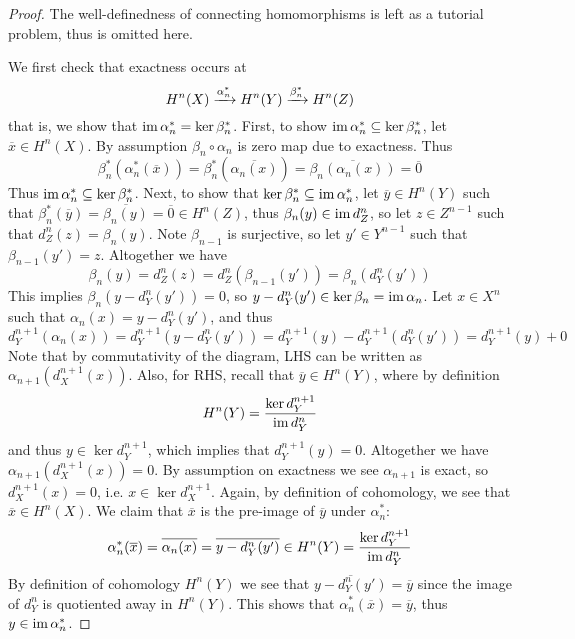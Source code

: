 \begin{proof}
    The well-definedness of connecting homomorphisms is left as a tutorial problem, thus is omitted here.

    We first check that exactness occurs at
    \[H^n(X)\xrightarrow{\alpha_n^*} H^n(Y)\xrightarrow{\beta_n^*} H^{n}(Z)\]
    that is, we show that $\operatorname{im} \alpha_n^* = \ker \beta_n^*$. First, to show $\operatorname{im} \alpha_n^* \subseteq \ker \beta_n^*$, let $\overline x\in H^n(X)$. By assumption $\beta_n\circ \alpha_n$ is zero map due to exactness. Thus 
    \[\beta_n^*(\alpha_n^*(\overline{x})) = \beta_n^*(\overline{\alpha_n(x)}) = \overline{\beta_n(\alpha_n(x))} = \overline{0}\]
    Thus $\operatorname{im} \alpha_n^*\subseteq \ker \beta_n^*$. Next, to show that $\ker \beta_n^* \subseteq \operatorname{im} \alpha_n^*$, let $\overline y\in H^n(Y)$ such that $\beta_n^*(\overline y) = \overline{\beta_n(y)}= \overline{0}\in H^n(Z)$, thus $\beta_n(y)\in \operatorname{im} d_Z^n$, so let $z\in Z^{n-1}$ such that $d_Z^n(z)=\beta_n(y)$. Note $\beta_{n-1}$ is surjective, so let $y'\in Y^{n-1}$ such that $\beta_{n-1}(y')=z$. Altogether we have
    \[\beta_n(y)=d_Z^n(z)=d_Z^n(\beta_{n-1}(y')) = \beta_n(d_Y^n(y'))\]
    This implies $\beta_n(y-d_Y^n(y'))=0$, so $y-d_Y^n(y')\in \ker \beta_n = \operatorname{im} \alpha_n$. Let $x\in X^n$ such that $\alpha_n(x) = y-d_Y^n(y')$, and thus
    \[d_Y^{n+1}(\alpha_n(x)) = d_Y^{n+1}(y-d_Y^n(y')) = d_Y^{n+1}(y) - d_Y^{n+1}(d_Y^n(y')) = d_Y^{n+1}(y)+0\]
    Note that by commutativity of the diagram, LHS can be written as $\alpha_{n+1}(d_X^{n+1}(x))$. Also, for RHS, recall that $\overline y \in H^n(Y)$, where by definition 
    \[H^n(Y) = \frac{\ker d_Y^{n+1}}{\operatorname{im} d_Y^n}\]
    and thus $y\in \ker d_Y^{n+1}$, which implies that $d_Y^{n+1}(y)=0$. Altogether we have $\alpha_{n+1}(d_X^{n+1}(x)) = 0$. By assumption on exactness we see $\alpha_{n+1}$ is exact, so $d_X^{n+1}(x) = 0$, i.e. $x\in \ker d_X^{n+1}$. Again, by definition of cohomology, we see that $\overline{x}\in H^n(X)$. We claim that $\overline{x}$ is the pre-image of $\overline{y}$ under $\alpha_n^*$:
    \[\alpha_n^*(\overline{x}) = \overline{\alpha_n(x)} = \overline{y - d_Y^n(y')}\in H^n(Y) = \frac{\ker d_Y^{n+1}}{\operatorname{im} d_Y^n}\]
    By definition of cohomology $H^n(Y)$ we see that $\overline{y-d_Y^n(y')} = \overline y$ since the image of $d_Y^n$ is quotiented away in $H^n(Y)$. This shows that $\alpha_n^*(\overline{x}) = \overline{y}$, thus $y\in \operatorname{im} \alpha_n^*$. 


\end{proof}
